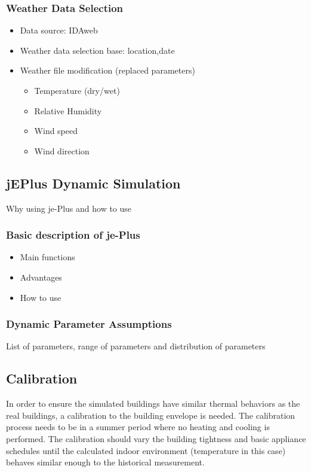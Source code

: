 \documentclass[11pt, a4paper]{article}
\theoremstyle{definition}
\begin{document}
		\subsubsection{Weather Data Selection}
			\begin{itemize}
				\item Data source: IDAweb
				\item Weather data selection base: location,date
				\item Weather file modification (replaced parameters)
					\begin{itemize}
						\item Temperature (dry/wet)
						\item Relative Humidity
						\item Wind speed
						\item Wind direction
					\end{itemize}
			\end{itemize}
			

	

	\subsection{jEPlus Dynamic Simulation}
		Why using je-Plus and how to use
		\subsubsection{Basic description of je-Plus}
		\begin{itemize}
			\item Main functions
			\item Advantages
			\item How to use
		\end{itemize}
	
		\subsubsection{Dynamic Parameter Assumptions}
		List of parameters, range of parameters and distribution of parameters


	\subsection{Calibration}
		In order to ensure the simulated buildings have similar thermal behaviors as the real buildings, a calibration to the building envelope is needed.
		The calibration process needs to be in a summer period where no heating and cooling is performed. The calibration should vary the building tightness and basic appliance schedules until the calculated indoor environment (temperature in this case) behaves similar enough to the historical measurement.
		
\end{document}
